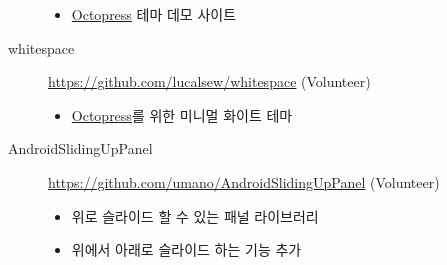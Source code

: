 \documentclass[a4paper,10pt]{article}
\begin{document}
\begin{description}
    \begin{itemize}
      \item \href{http://octopress.org}{Octopress} 테마 데모 사이트
    \end{itemize}
  \item[whitespace] \url{https://github.com/lucalsew/whitespace} (Volunteer)
    \begin{itemize}
      \item \href{http://octopress.org}{Octopress}를 위한 미니멀 화이트 테마
    \end{itemize}
  \item[AndroidSlidingUpPanel] \url{https://github.com/umano/AndroidSlidingUpPanel} (Volunteer)
    \begin{itemize}
      \item 위로 슬라이드 할 수 있는 패널 라이브러리
      \item 위에서 아래로 슬라이드 하는 기능 추가
    \end{itemize}
\end{description}


\end{document}
